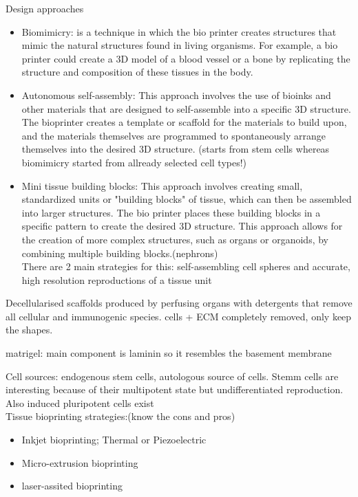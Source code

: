\documentclass{article}
\begin{document}
Design approaches
\begin{itemize}
    \item Biomimicry: is a technique in which the bio printer creates structures that mimic the natural structures found in living organisms. For example, a bio printer could create a 3D model of a blood vessel or a bone by replicating the structure and composition of these tissues in the body.
    \item Autonomous self-assembly: This approach involves the use of bioinks and other materials that are designed to self-assemble into a specific 3D structure. The bioprinter creates a template or scaffold for the materials to build upon, and the materials themselves are programmed to spontaneously arrange themselves into the desired 3D structure. (starts from stem cells whereas biomimicry started from allready selected cell types!)
    \item Mini tissue building blocks: This approach involves creating small, standardized units or "building blocks" of tissue, which can then be assembled into larger structures. The bio printer places these building blocks in a specific pattern to create the desired 3D structure. This approach allows for the creation of more complex structures, such as organs or organoids, by combining multiple building blocks.(nephrons)\\
    There are 2 main strategies for this: self-assembling cell spheres and accurate, high resolution reproductions of a tissue unit
\end{itemize}

Decellularised scaffolds produced by perfusing organs with detergents that remove all cellular and immunogenic species. cells + ECM completely removed, only keep the shapes.

matrigel: main component is laminin so it resembles the basement membrane

Cell sources: endogenous stem cells, autologous source of cells. Stemm cells are interesting because of their multipotent state but undifferentiated reproduction. Also induced pluripotent cells exist\\

Tissue bioprinting strategies:(know the cons and pros)
\begin{itemize}
    \item Inkjet bioprinting; Thermal or Piezoelectric
    \item Micro-extrusion bioprinting
    \item laser-assited bioprinting
\end{itemize}
\end{document}
